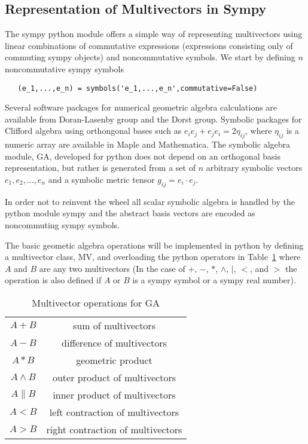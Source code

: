 \documentclass[10pt]{article}
\newcommand{\W}{\wedge}
\begin{document}
\subsection{Representation of Multivectors in Sympy}

The sympy python module offers a simple way of representing multivectors using linear
combinations of commutative expressions (expressions consisting only of commuting sympy objects)
and noncommutative symbols. We start by defining $n$ noncommutative sympy symbols

\begin{lstlisting}
   (e_1,...,e_n) = symbols('e_1,...,e_n',commutative=False)
\end{lstlisting}

Several software packages for numerical geometric algebra calculations are
available from Doran-Lasenby group and the Dorst group. Symbolic packages for
Clifford algebra using orthongonal bases such as
$e_{i}e_{j}+e_{j}e_{i} = 2\eta_{ij}$, where $\eta_{ij}$ is a numeric
array are available in Maple and Mathematica. The symbolic algebra module,
GA, developed for python does not depend on an orthogonal basis
representation, but rather is generated from a set of $n$ arbitrary
symbolic vectors $e_{1},e_{2},\dots,e_{n}$ and a symbolic metric
tensor $g_{ij} = e_{i}\cdot e_{j}$.

In order not to reinvent the wheel all scalar symbolic algebra is handled by the
python module sympy and the abstract basis vectors are encoded as
noncommuting sympy symbols.

The basic geometic algebra operations will be implemented in python by defining
a multivector class, MV, and overloading the python operators in Table~\ref{ops}
 where $A$ and $B$  are any two multivectors (In the case of
$+$, $-$, $*$, $\W$, $|$, $<$, and $>$ the operation is also defined if $A$ or
$B$ is a sympy symbol or a sympy real number).

\begin{table}
\begin{center}
\begin{tabular}{cc}
    $A+B$ & sum of multivectors \\
    $A-B$ & difference of multivectors \\
    $A*B$ & geometric product \\
    $A\W B$ & outer product of multivectors \\
    $A\|B$ & inner product of multivectors \\
    $A<B$ & left contraction of multivectors \\
    $A>B$ & right contraction of multivectors 
\end{tabular}
\end{center}
\caption{Multivector operations for GA}\label{ops}
\end{table}
\end{document}
